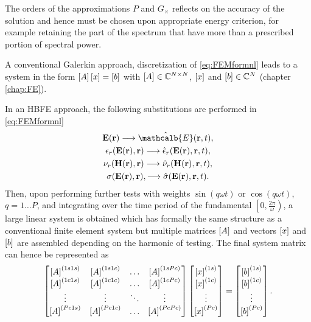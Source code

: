 The orders of the approximations $P$ and $G_\times$ reflects on the accuracy of the solution and hence must be chosen upon appropriate energy criterion, for example retaining the part of the spectrum that have more than a prescribed portion of spectral power.

A conventional Galerkin approach, discretization of \eqref{eq:FEMformnl} 
leads to a system in the form $\left[A\right]\left[{{x}}\right] = \left[{{b}}\right]$ with $\left[A\right] \in \mathbb{C}^{N \times N}$, $\left[{{x}}\right]$ and $\left[{{b}}\right] \in \mathbb{C}^{N}$ (chapter \ref{chap:FE}).

In an HBFE approach, the following substitutions are performed in \eqref{eq:FEMformnl} 
\begin{gather*}
 \mathbf{E}(\mathbf{r}) \longrightarrow \hat{\mathcalb{E}}(\mathbf{r}, t), \\
 \epsilon_r(\mathbf{E}(\mathbf{r}),\mathbf{r}) \longrightarrow \hat{\epsilon}_r(\mathbf{E}(\mathbf{r}),\mathbf{r}, t),\\
\nu_r(\mathbf{H}(\mathbf{r}),\mathbf{r}) \longrightarrow \hat{\nu}_r(\mathbf{H}(\mathbf{r}),\mathbf{r}, t),\\
\sigma(\mathbf{E}(\mathbf{r}),\mathbf{r}), \longrightarrow \hat{\sigma}(\mathbf{E}(\mathbf{r}),\mathbf{r}, t).
\end{gather*}
Then, upon performing further tests with weights $\sin(q \omega t)$ or $\cos(q \omega t)$, $q = 1 \dots P$, and integrating over the time period of the fundamental $\left [ 0,\frac{2\pi}{\omega} \right )$,  a large linear system is obtained which has formally the same structure as a conventional finite element system but multiple matrices $\left[A\right]$ and vectors $ \left[{{x}}\right]$ and $\left[{{b}}\right]$ are assembled depending on the harmonic of testing. The final system matrix can hence be represented as
%
\begin{equation}\label{eq:HBfemmn}
\begin{bmatrix}
\left[A\right]^{(1s1s)} & \left[A\right]^{(1s1c)} & \ldots &  \left[A\right]^{(1sPc)} \\
\left[A\right]^{(1c1s)} & \left[A\right]^{(1c1c)} & \ldots &  \left[A\right]^{(1cPc)} \\
\vdots & \vdots & \ddots & \vdots \\
\left[A\right]^{(Pc1s)} & \left[A\right]^{(Pc1c)} & \ldots &  \left[A\right]^{(PcPc)}
\end{bmatrix}
\begin{bmatrix}
\left[{{x}}\right]^{(1s)} \\
\left[{{x}}\right]^{(1c)} \\
\vdots \\
\left[{{x}}\right]^{(Pc)}
\end{bmatrix}
=
\begin{bmatrix}
\left[{{b}}\right]^{(1s)}\\
\left[{{b}}\right]^{(1c)}\\
\vdots\\
\left[{{b}}\right]^{(Pc)}
\end{bmatrix}.
\end{equation}


